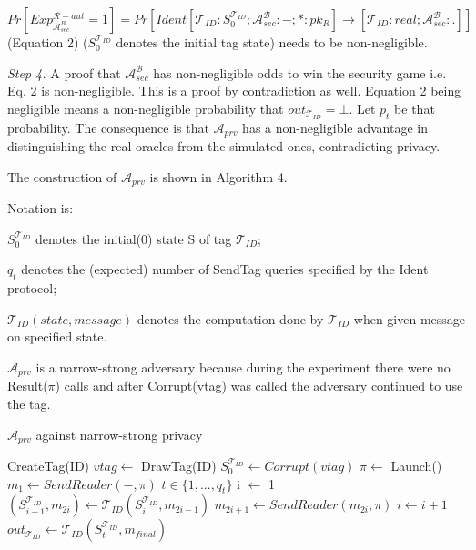     $Pr[Exp_{\mathcal{A}_{sec}^{B}}^{\mathcal{R}-aut} = 1] = Pr[Ident[\mathcal{T}_{ID}:S_0^{\mathcal{T}_{ID}}; \mathcal{A}_{sec}^{\mathcal{B}}:-; *:pk_{R}]
    \rightarrow [\mathcal{T}_{ID}:real; \mathcal{A}_{sec}^{\mathcal{B}}:.]]$ (Equation 2) ($S_0^{\mathcal{T}_{ID}}$ denotes the initial tag state)
    needs to be non-negligible.

    \textit{Step 4.} A proof that $\mathcal{A}_{sec}^{\mathcal{B}}$ has non-negligible odds to win the security game i.e. Eq. 2 is non-negligible.
    This is a proof by contradiction as well. Equation 2 being negligible means a non-negligible probability that $out_{\mathcal{T}_{ID}} = \bot$.
    Let $p_t$ be that probability. The consequence is that $\mathcal{A}_{prv}$ has a non-negligible advantage in distinguishing the real oracles 
    from the simulated ones, contradicting privacy.

    The construction of $\mathcal{A}_{prv}$ is shown in Algorithm 4.

    Notation is: 

    $S_0^{\mathcal{T}_{ID}}$ denotes the initial(0) state S of tag $\mathcal{T}_{ID}$;

    $q_t$ denotes the (expected) number of SendTag queries specified by the Ident protocol;

    $\mathcal{T}_{ID}(state, message)$ denotes the computation done by $\mathcal{T}_{ID}$ 
    when given message on specified state. 
    
    $\mathcal{A}_{prv}$ is a narrow-strong adversary because during the experiment there were no Result($\pi$) calls and after Corrupt(vtag) was called 
    the adversary continued to use the tag.
    
    \begin{algorithm}[H] %
        \centering
        \caption{$\mathcal{A}_{prv}$ against narrow-strong privacy}
        \begin{algorithmic}[1] %
            \State CreateTag(ID)
            \State $vtag \leftarrow$ DrawTag(ID)
            \State $S_0^{\mathcal{T}_{ID}} \gets Corrupt(vtag)$
            \State $\pi \leftarrow$ Launch() 
            \State $m_1 \leftarrow SendReader(-,\pi)$ 
            \State $t \in \{1, ..., q_t\}$
            \State i $\leftarrow$ 1
                \State $(S_{i+1}^{\mathcal{T}_{ID}}, m_{2i}) \gets 
                    \mathcal{T}_{ID}(S_{i}^{\mathcal{T}_{ID}}, m_{2i-1})$ 
                \State $m_{2i+1} \gets SendReader(m_{2i}, \pi)$
                \State $i \gets i+1$
            \EndWhile
            \State $out_{\mathcal{T}_{ID}} \gets \mathcal{T}_{ID}(S_t^{\mathcal{T}_{ID}}, m_{final})$
                \State {}
            \Else
                \State {}
            \EndIf
        \end{algorithmic}
    \end{algorithm}

